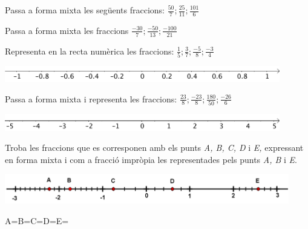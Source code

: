 \begin{mylist}
	\exer \spen  Passa a forma mixta les següents fraccions: $\frac{50}{7} ;\frac{25}{11} ;\frac{101}{6} $
 \vsooo
 
	\exer \spen Passa a forma mixta les fraccions $\frac{-30}{7} ;\frac{-50}{13} ;\frac{-100}{21} $ 
 \vsooo
 
	\exer \spen Representa en la recta numèrica les fraccions: $\frac{1}{5} ;\frac{3}{7} ;\frac{-5}{8} ;\frac{-3}{4} $ 
	\begin{center}
	\includegraphics[width=0.9\textwidth]{img-01/rectanum11}
	\end{center}
 \vsooo
 
	\exer \spen Passa a forma mixta i representa les fraccions: $\frac{23}{8} ;\frac{-23}{8} ;\frac{180}{50} ;\frac{-26}{6} $ 
	\begin{center}
		\includegraphics[width=0.9\textwidth]{img-01/rectanum}
	\end{center}
 \vsooo
\newpage
 
	\exer \spen  Troba les fraccions que es corresponen amb els punts \textit{A, B, C, D} i \textit{E, }expressant\textit{ }en forma mixta i com a fracció impròpia les representades pels punts \textit{A, B} i \textit{E}.
 
\includegraphics*[width=0.93\textwidth]{img-01/image4.png}

A=\quad\quad\quad\quad\quad\quad B=\quad\quad\quad\quad\quad\quad  C=\quad\quad\quad\quad\quad\quad  D=\quad\quad\quad\quad\quad\quad E=\quad\quad\quad\quad\quad\quad
 \vsooo

\end{mylist}

